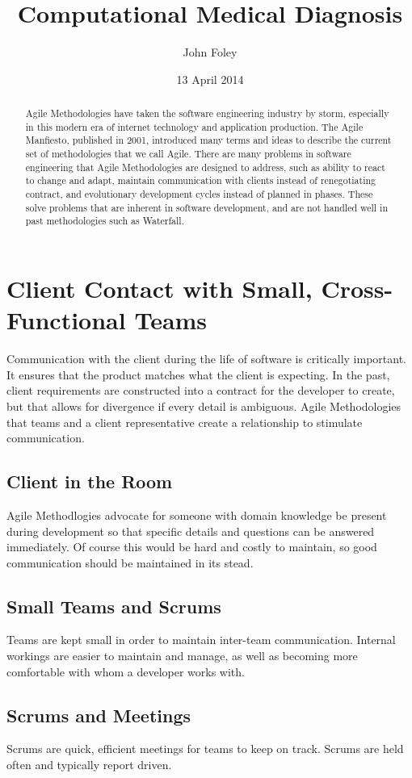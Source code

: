 \documentclass[11pt]{article}
\title{Computational Medical Diagnosis}
\author{John Foley}
\date{13 April 2014}
\begin{document}
\maketitle

\thispagestyle{empty}

\begin{abstract}
  Agile Methodologies have taken the software engineering industry by storm, especially in this modern
  era of internet technology and application production. The Agile Manfiesto, published in 2001,
 introduced many terms and ideas to describe the current set of methodologies that we call Agile. There are many
 problems in software engineering that Agile Methodologies are designed to address, such as ability to react to 
 change and adapt, maintain communication with clients instead of renegotiating contract, and evolutionary development cycles
 instead of planned in phases. These solve problems that are inherent in software development, and are not handled well in past
 methodologies such as Waterfall. 
\end{abstract}

\section{Client Contact with Small, Cross-Functional Teams}

Communication with the client during the life of software is critically important. It ensures that the product matches
what the client is expecting. In the past, client requirements are constructed into a contract for the developer to create,
but that allows for divergence if every detail is ambiguous.  Agile Methodologies that teams and a client representative
create a relationship to stimulate communication.

\subsection{Client in the Room}
Agile Methodlogies advocate for someone with domain knowledge be present during development so that specific details and 
questions can be answered immediately. Of course this would be hard and costly to maintain, so good communication 
should be maintained in its stead.

\subsection{Small Teams and Scrums}
Teams are kept small in order to maintain inter-team communication. Internal workings are easier to maintain and manage,
as well as becoming more comfortable with whom a developer works with.

\subsection{Scrums and Meetings}
Scrums are quick, efficient meetings for
teams to keep on track. Scrums are held often and typically report driven.



\nocite{*}



\end{document}

